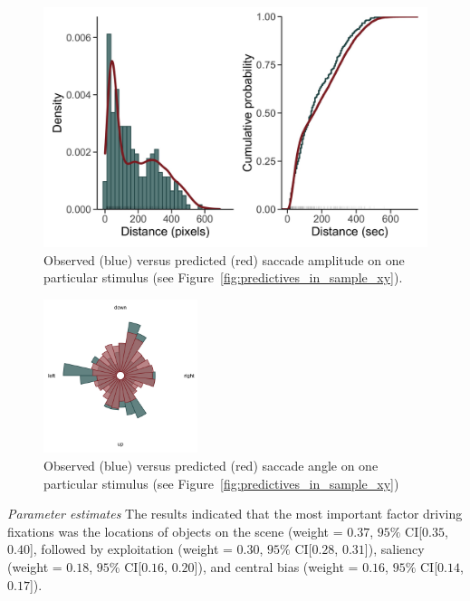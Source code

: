 \documentclass{article}
\begin{document}
\begin{figure}
    \centering
    \includegraphics[width=\textwidth]{figures/fit_model/in_sample/amplitude/1251.jpg}
    \caption{Observed (blue) versus predicted (red) saccade amplitude on one particular stimulus (see Figure~\ref{fig:predictives_in_sample_xy}).}
    \label{fig:predictives_in_sample_amplitude}
\end{figure}

\begin{figure}
    \centering
    \includegraphics[width=0.4\textwidth]{figures/fit_model/in_sample/angle/1251.jpg}
    \caption{Observed (blue) versus predicted (red) saccade angle on one particular stimulus (see Figure~\ref{fig:predictives_in_sample_xy})}
    \label{fig:predictives_in_sample_angle}
\end{figure}

\textit{Parameter estimates}
The results indicated that the most important factor driving fixations was the locations of objects on the scene (weight = $0.37$, $95\%$ CI[$0.35$, $0.40$], followed by exploitation (weight = $0.30$, $95\%$ CI[$0.28$, $0.31$]), saliency (weight = $0.18$, $95\%$ CI[$0.16$, $0.20$]), and central bias (weight = $0.16$, $95\%$ CI[$0.14$, $0.17$]).
\end{document}
